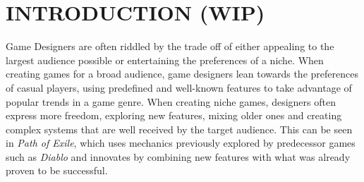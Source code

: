 \chapter{INTRODUCTION (WIP)}










Game Designers are often riddled by the trade off of either appealing to the largest audience possible or entertaining the preferences of a niche. When creating games for a broad audience, game designers lean towards the preferences of casual players, using predefined and well-known features to take advantage of popular trends in a game genre. When creating niche games, designers often express more freedom, exploring new features, mixing older ones and creating complex systems that are well received by the target audience. This can be seen in \emph{Path of Exile}, which uses mechanics previously explored by predecessor games such as \emph{Diablo} and innovates by combining new features with what was already proven to be successful.

